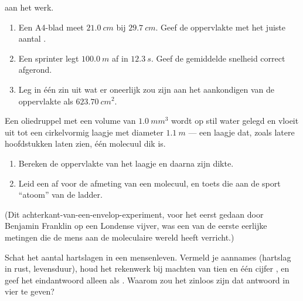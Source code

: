 \begin{exercise}[$\star\star$]\label{exo:g10:orders-of-magnitude:11}
 aan het werk.
\begin{enumerate}
  \item Een A4-blad meet $\qty{21.0}{cm}$ bij $\qty{29.7}{cm}$. Geef
        de oppervlakte met het juiste aantal .
  \item Een sprinter legt $\qty{100.0}{m}$ af in $\qty{12.3}{s}$. Geef
        de gemiddelde snelheid correct afgerond.
  \item Leg in één zin uit wat er oneerlijk zou zijn aan het
        aankondigen van de oppervlakte als $\qty{623.70}{cm^2}$.
\end{enumerate}
\end{exercise}

\begin{exercise}[$\star\star\star$]\label{exo:g10:orders-of-magnitude:12}
Een oliedruppel met een volume van $\qty{1.0}{mm^3}$ wordt op stil
water gelegd en vloeit uit tot een cirkelvormig laagje met diameter
$\qty{1.1}{m}$ --- een laagje dat, zoals latere hoofdstukken laten
zien, één molecuul dik is.
\begin{enumerate}
  \item Bereken de oppervlakte van het laagje en daarna zijn dikte.
  \item Leid een  af voor de afmeting van een molecuul, en
        toets die aan de sport ``atoom'' van de ladder.
\end{enumerate}
(Dit achterkant-van-een-envelop-experiment, voor het eerst gedaan door
Benjamin Franklin op een Londense vijver, was een van de eerste
eerlijke metingen die de mens aan de moleculaire wereld heeft
verricht.)
\end{exercise}

\begin{exercise}[$\star\star\star$]\label{exo:g10:orders-of-magnitude:13}
Schat het aantal hartslagen in een mensenleven. Vermeld je aannames
(hartslag in rust, levensduur), houd het rekenwerk bij machten van
tien en één cijfer , en geef het eindantwoord alleen als
. Waarom zou het zinloos zijn dat antwoord in vier
 te geven?
\end{exercise}

